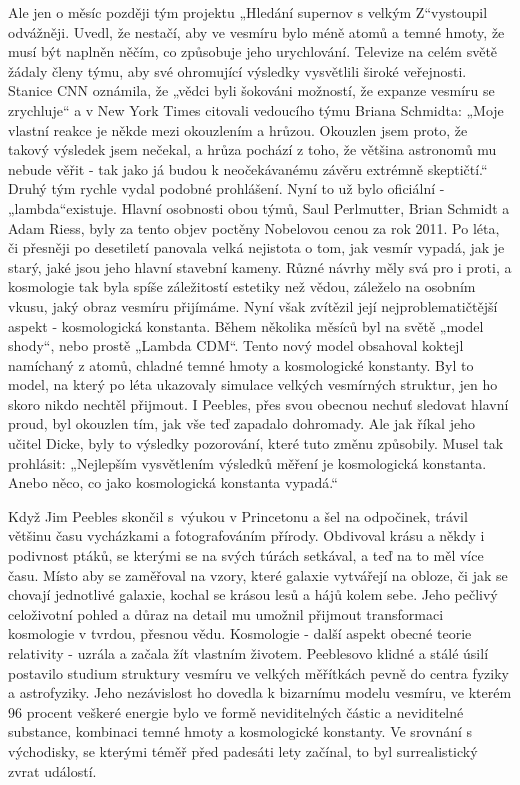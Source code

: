   Ale jen o měsíc později tým projektu „Hledání supernov s velkým Z“vystoupil odvážněji. Uvedl, že
  nestačí, aby ve vesmíru bylo méně atomů a temné hmoty, že musí být naplněn něčím, co způsobuje
  jeho urychlování. Televize na celém světě žádaly členy týmu, aby své ohromující výsledky
  vysvětlili široké veřejnosti. Stanice CNN oznámila, že „vědci byli šokováni možností, že expanze
  vesmíru se zrychluje“ a v New York Times citovali vedoucího týmu Briana Schmidta: „Moje vlastní
  reakce je někde mezi okouzlením a hrůzou. Okouzlen jsem proto, že takový výsledek jsem nečekal, a
  hrůza pochází z toho, že většina astronomů mu nebude věřit - tak jako já budou k neočekávanému
  závěru extrémně skeptičtí.“ Druhý tým rychle vydal podobné prohlášení. Nyní to už bylo oficiální -
  „lambda“existuje. Hlavní osobnosti obou týmů, Saul Perlmutter, Brian Schmidt a Adam Riess, byly za
  tento objev poctěny Nobelovou cenou za rok 2011. Po léta, či přesněji po desetiletí panovala velká
  nejistota o tom, jak vesmír vypadá, jak je starý, jaké jsou jeho hlavní stavební kameny. Různé
  návrhy měly svá pro i proti, a kosmologie tak byla spíše záležitostí estetiky než vědou, záleželo
  na osobním vkusu, jaký obraz vesmíru přijímáme. Nyní však zvítězil její nejproblematičtější aspekt
  - kosmologická konstanta. Během několika měsíců byl na světě „model shody“, nebo prostě „Lambda
  CDM“. Tento nový model obsahoval koktejl namíchaný z atomů, chladné temné hmoty a kosmologické
  konstanty. Byl to model, na který po léta ukazovaly simulace velkých vesmírných struktur, jen ho
  skoro nikdo nechtěl přijmout. I Peebles, přes svou obecnou nechuť sledovat hlavní proud, byl
  okouzlen tím, jak vše teď zapadalo dohromady. Ale jak říkal jeho učitel Dicke, byly to výsledky
  pozorování, které tuto změnu způsobily. Musel tak prohlásit: „Nejlepším vysvětlením výsledků
  měření je kosmologická konstanta. Anebo něco, co jako kosmologická konstanta vypadá.“
  
  Když Jim Peebles skončil s výukou v Princetonu a šel na odpočinek, trávil většinu času vycházkami
  a fotografováním přírody. Obdivoval krásu a někdy i podivnost ptáků, se kterými se na svých túrách
  setkával, a teď na to měl více času. Místo aby se zaměřoval na vzory, které galaxie vytvářejí na
  obloze, či jak se chovají jednotlivé galaxie, kochal se krásou lesů a hájů kolem sebe. Jeho
  pečlivý celoživotní pohled a důraz na detail mu umožnil přijmout transformaci kosmologie v tvrdou,
  přesnou vědu. Kosmologie - další aspekt obecné teorie relativity - uzrála a začala žít vlastním
  životem. Peeblesovo klidné a stálé úsilí postavilo studium struktury vesmíru ve velkých měřítkách
  pevně do centra fyziky a astrofyziky. Jeho nezávislost ho dovedla k bizarnímu modelu vesmíru, ve
  kterém 96 procent veškeré energie bylo ve formě neviditelných částic a neviditelné substance,
  kombinaci temné hmoty a kosmologické konstanty. Ve srovnání s východisky, se kterými téměř před
  padesáti lety začínal, to byl surrealistický zvrat událostí. 
  
